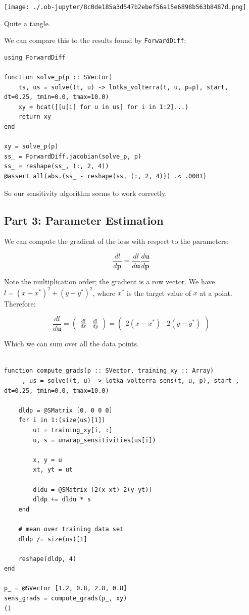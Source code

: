 \documentclass[nobib]{tufte-handout}
\newcommand{\uv}[0]{\mathbf{u}}
\newcommand{\pv}[0]{\mathbf{p}}
\begin{document}
\begin{center}
\texttt{[image: ./.ob-jupyter/8c0de185a3d547b2ebef56a15e6898b563b8487d.png]}
\end{center}

Quite a tangle.

We can compare this to the results found by \texttt{ForwardDiff}:

\begin{verbatim}
using ForwardDiff

function solve_p(p :: SVector)
    ts, us = solve((t, u) -> lotka_volterra(t, u, p=p), start, dt=0.25, tmin=0.0, tmax=10.0)
    xy = hcat([[u[i] for u in us] for i in 1:2]...)
    return xy
end

xy = solve_p(p)
ss_ = ForwardDiff.jacobian(solve_p, p)
ss_ = reshape(ss_, (:, 2, 4))
@assert all(abs.(ss_ - reshape(ss, (:, 2, 4))) .< .0001)
\end{verbatim}

So our sensitivity algorithm seems to work correctly.

\subsection{Part 3: Parameter Estimation}
\label{sec:orgd17c994}
We can compute the gradient of the loss with respect to the parameters:

$$\frac{dl}{d\pv} = \frac{dl}{d\uv} \frac{d\uv}{d\pv}$$

Note the multiplication order; the gradient is a row vector.
We have \(l = (x - x^*)^2 + (y - y^*)^2\), where \(x^*\) is the target value of \(x\) at a point. Therefore:

$$\frac{dl}{d\uv} = \left(\begin{array}{cc}\frac{dl}{dx} & \frac{dl}{dy}\end{array}\right)
   = \left(\begin{array}{cc} 2(x-x^*) & 2(y-y^*) \end{array}\right)$$

Which we can sum over all the data points.

\begin{verbatim}

function compute_grads(p :: SVector, training_xy :: Array)
    _, us = solve((t, u) -> lotka_volterra_sens(t, u, p), start_, dt=0.25, tmin=0.0, tmax=10.0)

    dldp = @SMatrix [0. 0 0 0]
    for i in 1:(size(us)[1])
        ut = training_xy[i, :]
        u, s = unwrap_sensitivities(us[i])

        x, y = u
        xt, yt = ut

        dldu = @SMatrix [2(x-xt) 2(y-yt)]
        dldp += dldu * s
    end

    # mean over training data set
    dldp /= size(us)[1]

    reshape(dldp, 4)
end

p_ = @SVector [1.2, 0.8, 2.8, 0.8]
sens_grads = compute_grads(p_, xy)
()
\end{verbatim}
\end{document}
